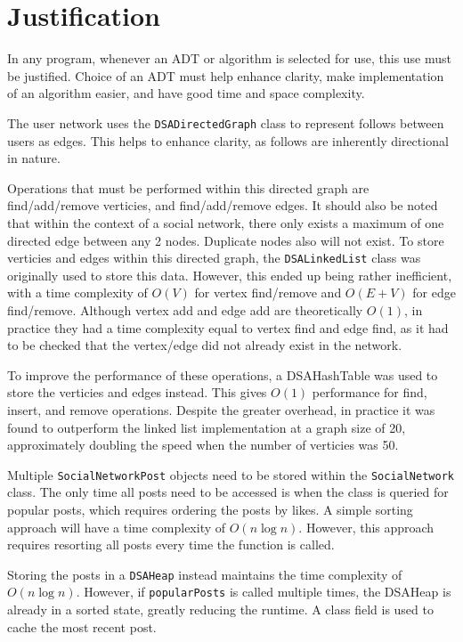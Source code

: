\documentclass{article}
\begin{document}
\section{Justification}
In any program, whenever an ADT or algorithm is selected for use, this use must be justified.
Choice of an ADT must help enhance clarity, make implementation of an algorithm easier,
and have good time and space complexity.

The user network uses the \texttt{DSADirectedGraph} class to represent follows between users
as edges. This helps to enhance clarity, as follows are inherently directional in nature.

Operations that must be performed within this directed graph are find/add/remove verticies,
and find/add/remove edges. It should also be noted that within the context of a social network,
there only exists a maximum of one directed edge between any 2 nodes. Duplicate nodes also will not
exist.
To store verticies and edges within this directed graph, the \texttt{DSALinkedList} class was originally
used to store this data. However, this ended up being rather inefficient, with a time complexity of
$O\left(V\right)$ for vertex find/remove and $O\left(E + V\right)$ for edge find/remove.
Although vertex add and edge add are theoretically $O\left(1\right)$, in practice they had a time complexity
equal to vertex find and edge find, as it had to be checked that the vertex/edge did not already exist in the network.

To improve the performance of these operations, a DSAHashTable was used to store the verticies and edges instead.
This gives $O\left(1\right)$
performance for find, insert, and remove operations. Despite the greater overhead, in practice it was found to outperform
the linked list implementation at a graph size of 20, approximately doubling the speed when the number of verticies was 50.

Multiple \texttt{SocialNetworkPost} objects need to be stored within the \texttt{SocialNetwork} class.
The only time all posts need to be accessed
is when the class is queried for popular posts, which requires ordering the posts by likes.
A simple sorting approach will have a time complexity of $O\left(n\log n\right)$. However, this
approach requires resorting all posts every time the function is called.

Storing the posts in a \texttt{DSAHeap} instead maintains
the time complexity of $O\left(n\log n\right)$. However, if \texttt{popularPosts}
is called multiple times, the DSAHeap is already in a sorted state, greatly reducing the runtime.
A class field is used to cache the most recent post.
\end{document}
